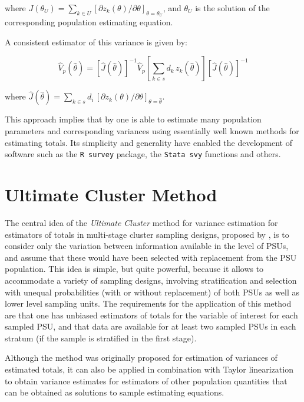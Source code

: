 \documentclass[
  12pt,
]{book}
\begin{document}
where \(J (\theta_U) = \sum _{k \in U} \left[ \partial{z_k (\theta)} / \partial \theta \right]_{\theta = \theta_U}\), and \(\theta_U\) is the solution of the corresponding population estimating equation.

A consistent estimator of this variance is given by:

\[
\widehat V_p (\widehat \theta) = \left[ \widehat J ( \widehat \theta) \right] ^{-1} \widehat V_p \left[ \sum _{k \in s} d_k \, z_k (\widehat \theta)\right] \left[ \widehat J ( \widehat \theta) \right] ^{-1}
\]

where \(\widehat J (\widehat \theta) = \sum _{k \in s} d_i \, \left[ \partial{z_k ( \theta)} / \partial \theta \right]_{\theta = \widehat \theta}\).

This approach implies that by one is able to estimate many population parameters and corresponding variances using essentially well known methods for estimating totals. Its simplicity and generality have enabled the development of software such as the \texttt{R\ survey} package, the \texttt{Stata\ svy} functions and others.

\hypertarget{ultimate-cluster-method}{%
\section{Ultimate Cluster Method}\label{ultimate-cluster-method}}

The central idea of the \emph{Ultimate Cluster} method for variance estimation for estimators of totals in multi-stage cluster sampling designs, proposed by \citep{Hansen1953}, is to consider only the variation between information available in the level of PSUs, and assume that these would have been selected with replacement from the PSU population. This idea is simple, but quite powerful, because it allows to accommodate a variety of sampling designs, involving stratification and selection with unequal probabilities (with or without replacement) of both PSUs as well as lower level sampling units. The requirements for the application of this method are that one has unbiased estimators of totals for the variable of interest for each sampled PSU, and that data are available for at least two sampled PSUs in each stratum (if the sample is stratified in the first stage).

Although the method was originally proposed for estimation of variances of estimated totals, it can also be applied in combination with Taylor linearization to obtain variance estimates for estimators of other population quantities that can be obtained as solutions to sample estimating equations.
\end{document}
